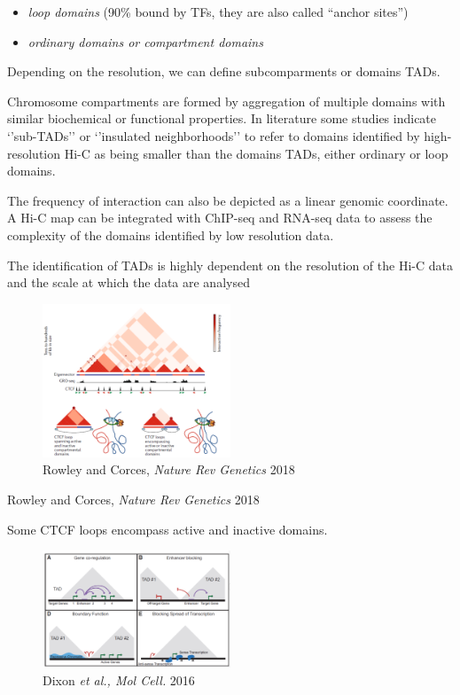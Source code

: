 \begin{itemize}
\tightlist
\item
  \emph{loop domains} (90\% bound by TFs, they are also called ``anchor sites'')
\item
  \emph{ordinary domains or compartment domains}
\end{itemize}

Depending on the resolution, we can define subcomparments or domains TADs.

Chromosome compartments are formed by aggregation of multiple domains with similar biochemical or functional properties. In literature some studies indicate `'sub-TADs'' or `'insulated neighborhoods'' to refer to domains identified by high-resolution Hi-C as being smaller than the domains TADs, either ordinary or loop domains.

The frequency of interaction can also be depicted as a linear genomic coordinate. A Hi-C map can be integrated with ChIP-seq and RNA-seq data to assess the complexity of the domains identified by low resolution data.

The identification of TADs is highly dependent on the resolution of the Hi-C data and the scale at which the data are analysed

\begin{figure}
\centering
\includegraphics[width=0.5\textwidth]{../_resources/Screenshot_2022-10-19_at_09-20-57.png}
\caption{Rowley and Corces, \emph{Nature Rev Genetics} 2018}
\end{figure}

Rowley and Corces, \emph{Nature Rev Genetics} 2018

Some CTCF loops encompass active and inactive domains.

\begin{figure}
\centering
\includegraphics[width=0.5\textwidth]{../_resources/Screenshot_2022-10-19_at_09-21-57.png}
\caption{Dixon \emph{et al., Mol Cell.} 2016}
\end{figure}

